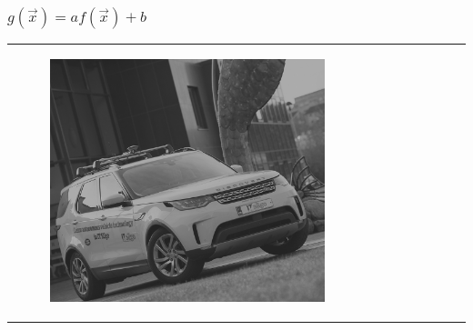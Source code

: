 \begin{frame}\frametitle{$g(\vec{x}) = af(\vec{x}) + b$}
\begin{tabular}{ccc}
        \begin{minipage}{0.3\textwidth}
            \begin{figure}[H]

	    \includegraphics[width=\textwidth]{images/CAV15LowContrast.jpg}
    \end{figure}
        \end{minipage}
        &
        \begin{minipage}{0.3\textwidth}
            
            \begin{figure}[H]


\end{figure}
\end{minipage}
\end{tabular}
\end{frame}
